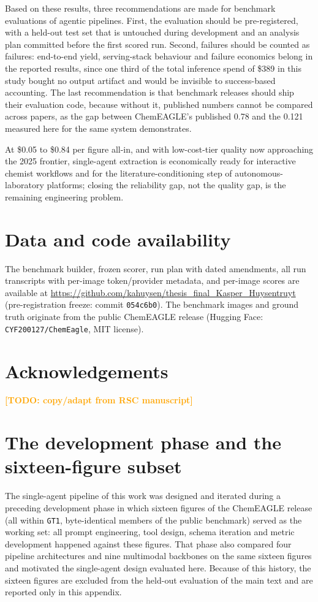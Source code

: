 \documentclass{article}
\newcommand{\TODO}[1]{\textcolor{orange}{\textbf{[TODO: #1]}}}
\begin{document}
Based on these results, three recommendations are made for benchmark
evaluations of agentic pipelines. First, the evaluation should be
pre-registered, with a held-out test set that is untouched during
development and an analysis plan committed before the first scored
run. Second, failures should be counted as failures: end-to-end yield,
serving-stack behaviour and failure economics belong in the reported
results, since one third of the total inference spend of \$389 in this
study bought no output artifact and would be invisible to
success-based accounting. The last recommendation is that benchmark
releases should ship their evaluation code, because without it,
published numbers cannot be compared across papers, as the gap between
ChemEAGLE's published 0.78 and the 0.121 measured here for the same
system demonstrates.

At \$0.05 to \$0.84 per figure all-in, and with low-cost-tier quality
now approaching the 2025 frontier, single-agent extraction is
economically ready for interactive chemist workflows and for the
literature-conditioning step of autonomous-laboratory platforms;
closing the reliability gap, not the quality gap, is the remaining
engineering problem.

\section*{Data and code availability}
The benchmark builder, frozen scorer, run plan with dated amendments, all
run transcripts with per-image token/provider metadata, and per-image
scores are available at
\url{https://github.com/kahuysen/thesis_final_Kasper_Huysentruyt}
(pre-registration freeze: commit \texttt{054c6b0}).
The benchmark images and ground truth originate from the public ChemEAGLE
release (Hugging Face: \texttt{CYF200127/ChemEagle}, MIT license).

\section*{Acknowledgements}
\TODO{copy/adapt from RSC manuscript}




\appendix
\section{The development phase and the sixteen-figure subset}
\label{app:dev}

The single-agent pipeline of this work was designed and iterated during
a preceding development phase in which sixteen figures of the ChemEAGLE
release (all within \texttt{GT1}, byte-identical members of the public
benchmark) served as the working set: all prompt engineering, tool
design, schema iteration and metric development happened against these
figures. That phase also compared four pipeline architectures and nine
multimodal backbones on the same sixteen figures and motivated the
single-agent design evaluated here. Because of this history, the
sixteen figures are excluded from the held-out evaluation of the main
text and are reported only in this appendix.
\end{document}
